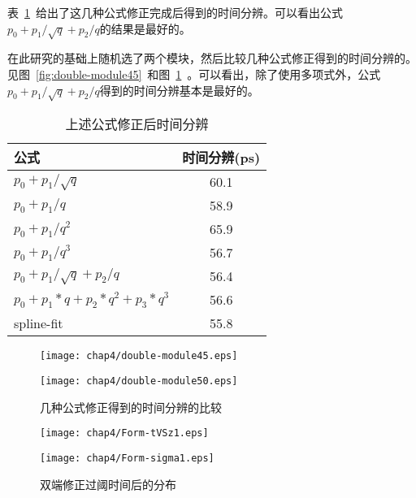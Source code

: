 表~\ref{tbl:combined-resolution}~给出了这几种公式修正完成后得到的时间分辨。可以看出公式${p_{0}+p_{1}/\sqrt{q}+p_{2}/q}$的结果是最好的。

在此研究的基础上随机选了两个模块，然后比较几种公式修正得到的时间分辨的。见图~\ref{fig:double-module45}~和图~\ref{fig:double-module50}~。可以看出，除了使用多项式外，公式${p_{0}+p_{1}/\sqrt{q}+p_{2}/q}$得到的时间分辨基本是最好的。

\begin{table}[h]
    \centering
    \caption{\label{tbl:combined-resolution} 上述公式修正后时间分辨}
  \footnotesize
    \begin{tabular}{lc}
        \hline
        公式& 时间分辨(ps) \\
        \hline
        ${p_{0}+p_{1}/\sqrt{q}}$ & 60.1 \\
        ${p_{0}+p_{1}/q}$ & 58.9 \\
        ${p_{0}+p_{1}/q^{2}}$ & 65.9 \\
        ${p_{0}+p_{1}/q^{3}}$ & 56.7 \\
        ${p_{0}+p_{1}/\sqrt{q}+p_{2}/q}$ & 56.4 \\
        ${p_{0}+p_{1}*q+p_{2}*q^{2}+p_{3}*q^3}$ & 56.6 \\
        spline-fit&   55.8 \\
        \hline
    \end{tabular}
\end{table}

\begin{figure}[!h]
\begin{minipage}[!h]{0.5\linewidth}
\texttt{[image: chap4/double-module45.eps]}
\label{fig:double-module45}
\end{minipage}%
\hfill
\begin{minipage}[!h]{0.5\linewidth}
\texttt{[image: chap4/double-module50.eps]}
\label{fig:double-module50}
\end{minipage}
\caption{几种公式修正得到的时间分辨的比较}
\end{figure}

\begin{figure}[!h]
\begin{minipage}[!h]{0.5\linewidth}
\texttt{[image: chap4/Form-tVSz1.eps]}
\label{fig:Form-tVSz1}
\end{minipage}%
\hfill
\begin{minipage}[!h]{0.5\linewidth}
\texttt{[image: chap4/Form-sigma1.eps]}
\label{fig:Form-sigma1}
\end{minipage}
\caption{双端修正过阈时间后的分布}
\end{figure}

